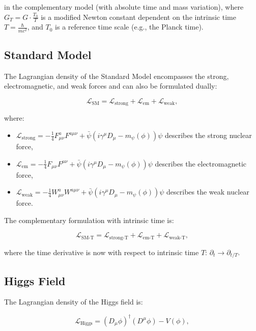 \documentclass{article}
\begin{document}
	in the complementary model (with absolute time and mass variation), where \(G_T = G \cdot \frac{T_0}{T}\) is a modified Newton constant dependent on the intrinsic time \(T = \frac{\hbar}{mc^2}\), and \(T_0\) is a reference time scale (e.g., the Planck time).
	
	\subsection{Standard Model}
	The Lagrangian density of the Standard Model encompasses the strong, electromagnetic, and weak forces and can also be formulated dually:
	
	\begin{equation}
		\mathcal{L}_\text{SM} = \mathcal{L}_\text{strong} + \mathcal{L}_\text{em} + \mathcal{L}_\text{weak},
	\end{equation}
	
	where:
	\begin{itemize}
		\item \(\mathcal{L}_\text{strong} = -\frac{1}{4} F_{\mu\nu}^a F^{a\mu\nu} + \bar{\psi}(i \gamma^\mu D_\mu - m_\psi(\phi))\psi\) describes the strong nuclear force,
		\item \(\mathcal{L}_\text{em} = -\frac{1}{4} F_{\mu\nu} F^{\mu\nu} + \bar{\psi}(i \gamma^\mu D_\mu - m_\psi(\phi))\psi\) describes the electromagnetic force,
		\item \(\mathcal{L}_\text{weak} = -\frac{1}{4} W_{\mu\nu}^a W^{a\mu\nu} + \bar{\psi}(i \gamma^\mu D_\mu - m_\psi(\phi))\psi\) describes the weak nuclear force.
	\end{itemize}
	
	The complementary formulation with intrinsic time is:
	
	\begin{equation}
		\mathcal{L}_\text{SM-T} = \mathcal{L}_\text{strong-T} + \mathcal{L}_\text{em-T} + \mathcal{L}_\text{weak-T},
	\end{equation}
	
	where the time derivative is now with respect to intrinsic time \(T\): \(\partial_t \rightarrow \partial_{t/T}\).
	
	\subsection{Higgs Field}
	The Lagrangian density of the Higgs field is:
	
	\begin{equation}
		\mathcal{L}_\text{Higgs} = (D_\mu \phi)^\dagger (D^\mu \phi) - V(\phi),
	\end{equation}
	
\end{document}
